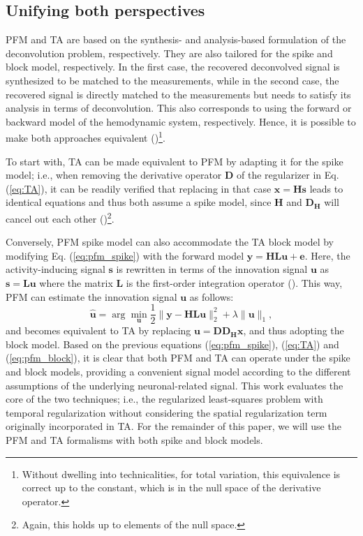 \subsection{Unifying both perspectives}

PFM and TA are based on the synthesis- and analysis-based formulation of the deconvolution problem, respectively. They are also tailored for the spike and block model, respectively. In the first case, the recovered deconvolved signal is synthesized to be matched to the measurements, while in the second case, the recovered signal is directly matched to the measurements but needs to satisfy its analysis in terms of deconvolution. This also corresponds to using the forward or backward model of the hemodynamic system, respectively. Hence, it is possible to make both approaches equivalent (\citealt{Elad2007Analysisversussynthesis})\footnote{Without dwelling into technicalities, for total variation, this equivalence is correct up to the constant, which is in the null space of the derivative operator.}.

To start with, TA can be made equivalent to PFM by adapting it for the spike model; i.e., when removing the derivative operator $\mathbf{D}$ of the regularizer in Eq. (\ref{eq:TA}), it can be readily verified that replacing in that case $\mathbf{x}=\mathbf{Hs}$ leads to identical equations and thus both assume a spike model, since $\mathbf{H}$ and $\mathbf{D_H}$ will cancel out each other (\citealt{Karahanoglu2011SignalProcessingApproach})\footnote{Again, this holds up to elements of the null space.}.

Conversely, PFM spike model can also accommodate the TA block model by modifying Eq. (\ref{eq:pfm_spike}) with the forward model $\mathbf{y} = \mathbf{H L u} + \mathbf{e}$. Here, the activity-inducing signal $\mathbf{s}$ is rewritten in terms of the innovation signal $\mathbf{u}$ as $\mathbf{s}=\mathbf{Lu}$ where the matrix $\mathbf{L}$ is the first-order integration operator (\citealt{Cherkaoui2019SparsitybasedBlind,Urunuela2020StabilityBasedSparse}). This way, PFM can estimate the innovation signal $\mathbf{u}$ as follows: 
\begin{equation}
    \label{eq:pfm_block}
    \hat{\mathbf{u}} = \arg \min_{\mathbf{u}} \frac{1}{2} \| \mathbf{y} - \mathbf{HLu} \|_2^2 + \lambda \| \mathbf{u} \|_1,
\end{equation}
and becomes equivalent to TA by replacing $\mathbf{u}=\mathbf{D D_H x}$, and thus adopting the block model. Based on the previous equations (\ref{eq:pfm_spike}), (\ref{eq:TA}) and (\ref{eq:pfm_block}), it is clear that both PFM and TA can operate under the spike and block models, providing a convenient signal model according to the different assumptions of the underlying neuronal-related signal. This work evaluates the core of the two techniques; i.e., the regularized least-squares problem with temporal regularization without considering the spatial regularization term originally incorporated in TA. For the remainder of this paper, we will use the PFM and TA formalisms with both spike and block models. 

